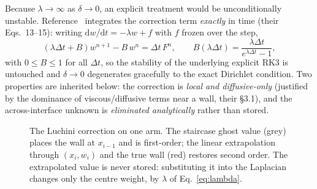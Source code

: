 \documentclass[11pt,a4paper]{article}
\newcommand{\dd}{\mathrm{d}}
\begin{document}
Because $\lambda\to\infty$ as $\delta\to0$, an explicit treatment would be
unconditionally unstable. Reference~\cite{luchini2025} integrates the correction
term \emph{exactly} in time (their Eqs.~13--15): writing
$\dd w/\dd t = -\lambda w + f$ with $f$ frozen over the step,
\begin{equation}
  \left(\lambda\Delta t + B\right)w^{n+1} - B\,w^{n} = \Delta t\,F^{n},
  \qquad
  B(\lambda\Delta t)=\frac{\lambda\Delta t}{e^{\lambda\Delta t}-1},
  \label{eq:luchini-B}
\end{equation}
with $0\le B\le 1$ for all $\Delta t$, so the stability of the underlying
explicit RK3 is untouched and $\delta\to0$ degenerates gracefully to the exact
Dirichlet condition. Two properties are inherited below: the correction is
\emph{local and diffusive-only} (justified by the dominance of viscous/diffusive
terms near a wall, their \S3.1), and the across-interface unknown is
\emph{eliminated analytically} rather than stored.

\begin{figure}[htbp]
\centering
{}
\caption{The Luchini correction on one arm. The staircase ghost value (grey)
places the wall at $x_{i-1}$ and is first-order; the linear extrapolation
through $(x_i,w_i)$ and the true wall (red) restores second order. The
extrapolated value is never stored: substituting it into the Laplacian changes
only the centre weight, by $\lambda$ of Eq.~\eqref{eq:lambda}.}
\label{fig:luchini}
\end{figure}
\end{document}
